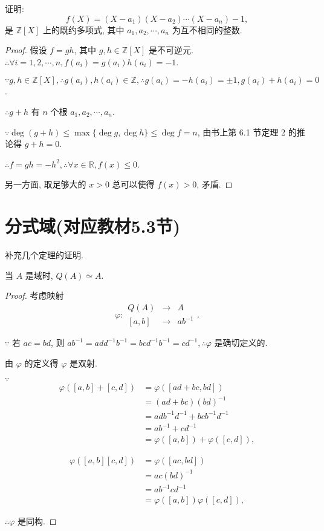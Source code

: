 \documentclass[color=black,device=normal,lang=cn,mode=geye]{elegantnote}
\begin{document}
\begin{example}
    证明:
    \[f(X)=(X-a_1)(X-a_2)\cdots(X-a_n)-1,\]
    是 $\mathbb{Z}[X]$ 上的既约多项式, 其中 $a_1,a_2,\cdots,a_n$ 为互不相同的整数.
\end{example}
\begin{proof}
    假设 $f=gh$, 其中 $g,h\in\mathbb{Z}[X]$ 是不可逆元. $\therefore\forall i=1,2,\cdots,n,f(a_i)=g(a_i)h(a_i)=-1$.

    $\because g,h\in\mathbb{Z}[X],\therefore g(a_i),h(a_i)\in\mathbb{Z},\therefore g(a_i)=-h(a_i)=\pm 1,g(a_i)+h(a_i)=0$.

    $\therefore g+h$ 有 $n$ 个根 $a_1,a_2,\cdots,a_n$.

    $\because\deg(g+h)\leq\max\{\deg g,\deg h\}\leq\deg f=n$, 由书上第 6.1 节定理 2 的推论得 $g+h=0$.

    $\therefore f=gh=-h^2,\therefore\forall x\in\mathbb{R},f(x)\leq0$.

    另一方面, 取足够大的 $x>0$ 总可以使得 $f(x)>0$, 矛盾.
\end{proof}
\section{分式域(对应教材5.3节)}
补充几个定理的证明.
\begin{theorem}\label{t4.1}
    当 $A$ 是域时, $Q(A)\simeq A$.
\end{theorem}
\begin{proof}
    考虑映射
    \[\varphi:\begin{array}{rcl}
        Q(A) & \to & A \\[3pt]
        [a,b] & \to & ab^{-1}
    \end{array}.\]

    $\because$ 若 $ac=bd$, 则 $ab^{-1}=add^{-1}b^{-1}=bcd^{-1}b^{-1}=cd^{-1},\therefore\varphi$ 是确切定义的.

    由 $\varphi$ 的定义得 $\varphi$ 是双射.

    $\because$
    \begin{align*}
        \varphi([a,b]+[c,d]) & =\varphi([ad+bc,bd]) \\
        & =(ad+bc)(bd)^{-1} \\
        & =adb^{-1}d^{-1}+bcb^{-1}d^{-1} \\
        & =ab^{-1}+cd^{-1} \\
        & =\varphi([a,b])+\varphi([c,d]),
    \end{align*}
    
    \begin{align*}
        \varphi([a,b][c,d]) & =\varphi([ac,bd]) \\
        & =ac(bd)^{-1} \\
        & =ab^{-1}cd^{-1} \\
        & =\varphi([a,b])\varphi([c,d]),
    \end{align*}

    $\therefore\varphi$ 是同构.
\end{proof}
\end{document}
